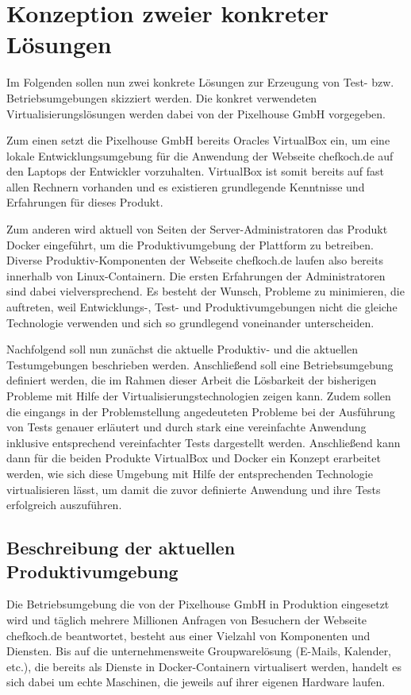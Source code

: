 \section{Konzeption zweier konkreter Lösungen}

Im Folgenden sollen nun zwei konkrete Lösungen zur Erzeugung von Test- bzw. Betriebsumgebungen skizziert werden. Die konkret verwendeten Virtualisierungslösungen werden dabei von der Pixelhouse GmbH vorgegeben.

Zum einen setzt die Pixelhouse GmbH bereits Oracles VirtualBox ein, um eine lokale Entwicklungsumgebung für die Anwendung der Webseite chefkoch.de auf den Laptops der Entwickler vorzuhalten. VirtualBox ist somit bereits auf fast allen Rechnern vorhanden und es existieren grundlegende Kenntnisse und Erfahrungen für dieses Produkt.

Zum anderen wird aktuell von Seiten der Server-Administratoren das Produkt Docker eingeführt, um die Produktivumgebung der Plattform zu betreiben. Diverse Produktiv-Komponenten der Webseite chefkoch.de laufen also bereits innerhalb von Linux-Containern. Die ersten Erfahrungen der Administratoren sind dabei vielversprechend. Es besteht der Wunsch, Probleme zu minimieren, die auftreten, weil Entwicklungs-, Test- und Produktivumgebungen nicht die gleiche Technologie verwenden und sich so grundlegend voneinander unterscheiden.

Nachfolgend soll nun zunächst die aktuelle Produktiv- und die aktuellen Testumgebungen beschrieben werden. Anschließend soll eine Betriebsumgebung definiert werden, die im Rahmen dieser Arbeit die Lösbarkeit der bisherigen Probleme mit Hilfe der Virtualisierungstechnologien zeigen kann. Zudem sollen die eingangs in der Problemstellung angedeuteten Probleme bei der Ausführung von Tests genauer erläutert und durch stark eine vereinfachte Anwendung inklusive entsprechend vereinfachter Tests dargestellt werden. Anschließend kann dann für die beiden Produkte VirtualBox und Docker ein Konzept erarbeitet werden, wie sich diese Umgebung mit Hilfe der entsprechenden Technologie virtualisieren lässt, um damit die zuvor definierte Anwendung und ihre Tests erfolgreich auszuführen.

\subsection{Beschreibung der aktuellen Produktivumgebung}

Die Betriebsumgebung die von der Pixelhouse GmbH in Produktion eingesetzt wird und täglich mehrere Millionen Anfragen von Besuchern der Webseite chefkoch.de beantwortet, besteht aus einer Vielzahl von Komponenten und Diensten. Bis auf die unternehmensweite Groupwarelösung (E-Mails, Kalender, etc.), die bereits als Dienste in Docker-Containern virtualisert werden, handelt es sich dabei um echte Maschinen, die jeweils auf ihrer eigenen Hardware laufen.

